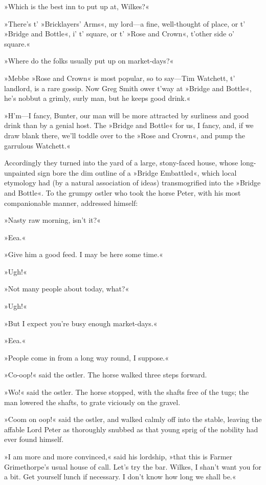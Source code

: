 »Which is the best inn to put up at, Wilkes?«

»There's t' »Bricklayers' Arms«, my lord\allowbreak---\allowbreak a fine, well-thought of place, or t' »Bridge and Bottle«, i' t' square, or t' »Rose and Crown«, t'other side o' square.«

»Where do the folks usually put up on market-days?«

»Mebbe »Rose and Crown« is most popular, so to say\allowbreak---\allowbreak Tim Watchett, t' landlord, is a rare gossip. Now Greg Smith ower t'way at »Bridge and Bottle«, he's nobbut a grimly, surly man, but he keeps good drink.«

»H'm\allowbreak---\allowbreak I fancy, Bunter, our man will be more attracted by surliness and good drink than by a genial host. The »Bridge and Bottle« for us, I fancy, and, if we draw blank there, we'll toddle over to the »Rose and Crown«, and pump the garrulous Watchett.«

Accordingly they turned into the yard of a large, stony-faced house, whose long-unpainted sign bore the dim outline of a »Bridge Embattled«, which local etymology had (by a natural association of ideas) transmogrified into the »Bridge and Bottle«. To the grumpy ostler who took the horse Peter, with his most companionable manner, addressed himself:

»Nasty raw morning, isn't it?«

»Eea.«

»Give him a good feed. I may be here some time.«

»Ugh!«

»Not many people about today, what?«

»Ugh!«

»But I expect you're busy enough market-days.«

»Eea.«

»People come in from a long way round, I suppose.«

»Co-oop!« said the ostler. The horse walked three steps forward.

»Wo!« said the ostler. The horse stopped, with the shafts free of the tugs; the man lowered the shafts, to grate viciously on the gravel.

»Coom on oop!« said the ostler, and walked calmly off into the stable, leaving the affable Lord Peter as thoroughly snubbed as that young sprig of the nobility had ever found himself.

»I am more and more convinced,« said his lordship, »that this is Farmer Grimethorpe's usual house of call. Let's try the bar. Wilkes, I shan't want you for a bit. Get yourself lunch if necessary. I don't know how long we shall be.«

